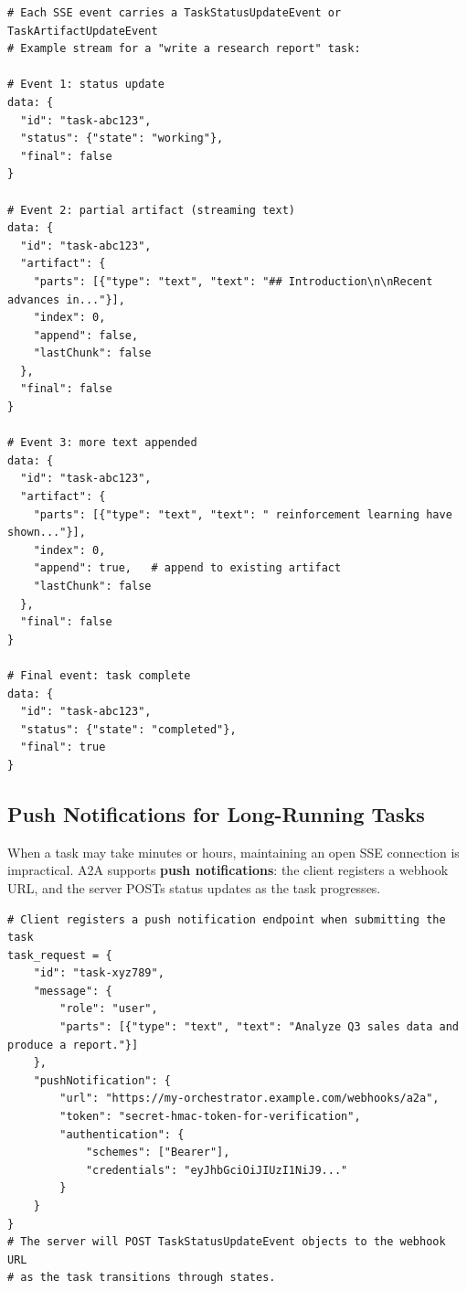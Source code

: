 \begin{examplebox}
\begin{lstlisting}[style=pythonstyle]
# Each SSE event carries a TaskStatusUpdateEvent or TaskArtifactUpdateEvent
# Example stream for a "write a research report" task:

# Event 1: status update
data: {
  "id": "task-abc123",
  "status": {"state": "working"},
  "final": false
}

# Event 2: partial artifact (streaming text)
data: {
  "id": "task-abc123",
  "artifact": {
    "parts": [{"type": "text", "text": "## Introduction\n\nRecent advances in..."}],
    "index": 0,
    "append": false,
    "lastChunk": false
  },
  "final": false
}

# Event 3: more text appended
data: {
  "id": "task-abc123",
  "artifact": {
    "parts": [{"type": "text", "text": " reinforcement learning have shown..."}],
    "index": 0,
    "append": true,   # append to existing artifact
    "lastChunk": false
  },
  "final": false
}

# Final event: task complete
data: {
  "id": "task-abc123",
  "status": {"state": "completed"},
  "final": true
}
\end{lstlisting}
\end{examplebox}

\subsection{Push Notifications for Long-Running Tasks}
\label{push-notifications-for-long-running-tasks}

When a task may take minutes or hours, maintaining an open SSE connection is impractical. A2A supports \textbf{push notifications}: the client registers a webhook URL, and the server POSTs status updates as the task progresses.

\begin{lstlisting}[style=pythonstyle]
# Client registers a push notification endpoint when submitting the task
task_request = {
    "id": "task-xyz789",
    "message": {
        "role": "user",
        "parts": [{"type": "text", "text": "Analyze Q3 sales data and produce a report."}]
    },
    "pushNotification": {
        "url": "https://my-orchestrator.example.com/webhooks/a2a",
        "token": "secret-hmac-token-for-verification",
        "authentication": {
            "schemes": ["Bearer"],
            "credentials": "eyJhbGciOiJIUzI1NiJ9..."
        }
    }
}
# The server will POST TaskStatusUpdateEvent objects to the webhook URL
# as the task transitions through states.
\end{lstlisting}


